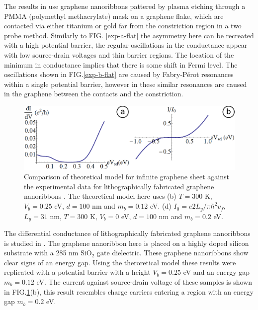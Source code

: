 \documentclass[prl,twocolumn,aps,superscriptaddress,floatfix,10pt]{revtex4}
\begin{document}
	The results in \cite{b14} use graphene nanoribbons pattered by plasma etching through a PMMA (polymethyl methacrylate) mask on a graphene flake, which are contacted via either titanium or gold far from the constriction region in a two probe method. Similarly to FIG. \ref{exp-a-flat} the asymmetry here can be recreated with a high potential barrier, the regular oscillations in the conductance appear with low source-drain voltages and thin barrier regions. The location of the minimum in conductance implies that there is some shift in Fermi level. The oscillations shown in FIG.\ref{exp-b-flat} are caused by Fabry-P\'{e}rot resonances within a single potential barrier, however in \cite{b12} these similar resonances are caused in the graphene between the contacts and the constriction.
\begin{figure}
	\includegraphics[scale=0.2]{exp-c-flat}
	\caption{Comparison of theoretical model for infinite graphene sheet against the experimental data for lithographically fabricated graphene nanoribbons \cite{b12}. The theoretical model here uses (b) $T=300$ K, $V_{b}=0.25$ eV, $d=100$ nm and $m_{b}=0.12$ eV. (d) $I_{0}=e2L_{y}/\pi\hbar^{2}v_{f}$, $L_{y}=31$ nm, $T=300$ K, $V_{b}=0$ eV, $d=100$ nm and $m_{b}=0.2$ eV.}
	\label{exp-c-flat}
\end{figure}

	The differential conductance of lithographically fabricated graphene nanoribbons is studied in \cite{b12}. The graphene nanoribbon here is placed on a highly doped silicon substrate with a 285 nm SiO$_{2}$ gate dielectric. These graphene nanoribbons show clear signs of an energy gap. Using the theroretical model these results were replicated with a potential barrier with a height $V_{b}=0.25$ eV and an energy gap $m_{b}=0.12$ eV. The current against source-drain voltage of these samples is shown in FIG.\ref{exp-c-flat}(b), this result resembles charge carriers entering a region with an energy gap $m_{b}=0.2$ eV.
\end{document}
